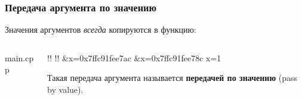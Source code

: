 \documentclass[compress, 8pt]{beamer}
\begin{document}
\begin{frame}[fragile]

    \frametitle{Передача аргумента по значению}

    Значения аргументов \textit{всегда}\footnotemark{} копируются в функцию:


    \begin{columns}[T]

        \begin{column}{0.5\textwidth}

                {main.cpp}

        \end{column}

        \begin{column}{0.5\textwidth}

            \begin{terminalwindow}
!!
!!
&x=0x7ffc91fee7ac
&x=0x7ffc91fee78c
x=1
            \end{terminalwindow}

            Такая передача аргумента называется \textbf{передачей по значению}
            (pass by value).

        \end{column}

    \end{columns}

\end{frame}
\end{document}
